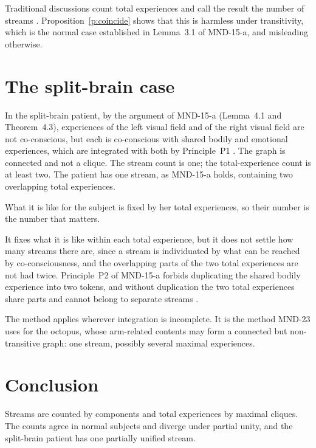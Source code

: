 \documentclass{situationist-preprint}
\begin{document}
Traditional discussions count total experiences and call the result the number of streams \citep{Nagel1971,Bayne2010}. Proposition~\ref{p:coincide} shows that this is harmless under transitivity, which is the normal case established in Lemma~3.1 of MND-15-a, and misleading otherwise.

\section{The split-brain case}

In the split-brain patient, by the argument of MND-15-a (Lemma~4.1 and Theorem~4.3), experiences of the left visual field and of the right visual field are not co-conscious, but each is co-conscious with shared bodily and emotional experiences, which are integrated with both by Principle~P1 \citep{Pinto2017}. The graph is connected and not a clique. The stream count is one; the total-experience count is at least two. The patient has one stream, as MND-15-a holds, containing two overlapping total experiences.

\begin{objection}
What it is like for the subject is fixed by her total experiences, so their number is the number that matters.
\end{objection}

\begin{reply}
It fixes what it is like within each total experience, but it does not settle how many streams there are, since a stream is individuated by what can be reached by co-consciousness, and the overlapping parts of the two total experiences are not had twice. Principle~P2 of MND-15-a forbids duplicating the shared bodily experience into two tokens, and without duplication the two total experiences share parts and cannot belong to separate streams \citep{Hurley1998,Lockwood1989}.
\end{reply}

The method applies wherever integration is incomplete. It is the method MND-23 uses for the octopus, whose arm-related contents may form a connected but non-transitive graph: one stream, possibly several maximal experiences.

\section{Conclusion}

Streams are counted by components and total experiences by maximal cliques. The counts agree in normal subjects and diverge under partial unity, and the split-brain patient has one partially unified stream.
\end{document}
